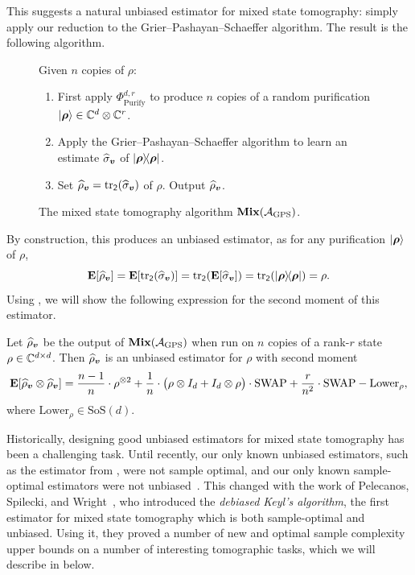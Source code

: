 \documentclass{article}
\newcommand{\mixed}{\textup{\textbf{Mix}}}
\newcommand{\gps}{\calA_{\mathrm{GPS}}}
\newcommand{\symsep}{\mathrm{SoS}}
\newcommand{\purifychan}{\Phi_{\mathrm{Purify}}}
\newcommand{\swap}{\mathrm{SWAP}}
\newcommand{\reg}[1]{\mathsf{#1}}
\begin{document}
This suggests a natural unbiased estimator for mixed state tomography:
simply apply our reduction to the Grier--Pashayan--Schaeffer algorithm.
The result is the following algorithm.

{
\begin{figure}[H]
Given $n$ copies of $\rho$:
\begin{enumerate}
    \item\label{item:purify} First apply $\purifychan^{d, r}$ to produce $n$ copies of a random purification $\ket{\boldsymbol{\rho}} \in \mathbb C^d \otimes \mathbb C^r$.
    \item Apply the Grier--Pashayan--Schaeffer algorithm to learn an estimate $\widehat{\sigma}_{\boldsymbol{v}}$ of $\ketbra{\boldsymbol{\rho}}$.
    \item Set $\widehat{\rho}_{\bv} = \tr_{\reg{2}}(\widehat{\sigma}_{\bv})$ of $\rho$. Output $\widehat{\rho}_{\boldsymbol{v}}$.
\end{enumerate}
\caption{The mixed state tomography algorithm $\mixed(\gps)$.}
\label{fig:gps-reduction-basic}
\end{figure}
}

\noindent
By construction, this produces an unbiased estimator, as for any purification $\ket{\boldsymbol{\rho}}$ of $\rho$,
\begin{equation*}
    \E[\widehat{\rho}_{\bv}]
    = \E[\tr_{\reg{2}}(\widehat{\sigma}_{\bv})]
    = \tr_{\reg{2}}(\E[\widehat{\sigma}_{\bv}])
    = \tr_{\reg{2}}(\ketbra{\brho})
    = \rho.
\end{equation*}
Using ,
we will show the following expression for the second moment of this estimator.

\begin{theorem} \label{thm:gps-moments-loose}
    Let $\widehat{\rho}_{\boldsymbol{v}}$ be the output of $\mixed(\gps)$ when run on $n$ copies of a rank-$r$ state $\rho \in \mathbb C^{d \times d}$.
    Then $\widehat{\rho}_{\boldsymbol{v}}$ is an unbiased estimator for $\rho$ with second moment
    \begin{equation*}
    \E[\widehat{\rho}_{\bv}\otimes \widehat{\rho}_{\bv}] = \frac{n-1}{n} \cdot \rho^{\otimes 2} + \frac{1}{n} \cdot \big(\rho \otimes I_d + I_d \otimes \rho\big) \cdot \swap + \frac{r}{n^2} \cdot \swap-\mathrm{Lower}_{\rho},
    \end{equation*}
    where $\mathrm{Lower}_{\rho} \in \symsep(d)$.
\end{theorem}

Historically, designing good unbiased estimators for mixed state tomography has been a challenging task.
Until recently,
our only known unbiased estimators,
such as the estimator from , 
were not sample optimal,
and our only known sample-optimal estimators
were not unbiased~\cite{OW16,HHJ+16}.
This changed with the work of Pelecanos, Spilecki, and Wright~\cite{PSW25}, who introduced the \emph{debiased Keyl's algorithm},
the first estimator for mixed state tomography which is both sample-optimal and unbiased.
Using it, they proved a number of new and optimal sample complexity upper bounds on a number of interesting tomographic tasks,
which we will describe in  below.
\end{document}
